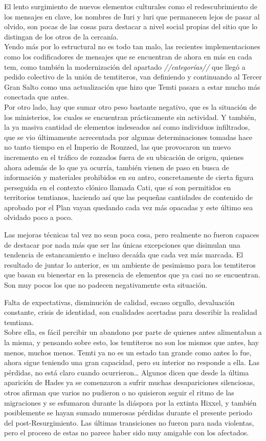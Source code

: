 \documentclass[
  spanish,
]{book}
\begin{document}
El lento surgimiento de nuevos elementos culturales como el redescubrimiento de los mensajes en clave, los nombres de Iuri y luri que permanecen lejos de pasar al olvido, son pocas de las cosas para destacar a nivel social propias del sitio que lo distingan de los otros de la cercanía.\\
Yendo más por lo estructural no es todo tan malo, las recientes implementaciones como los codificadores de mensajes que se encuentran de ahora en más en cada tem, como también la modernización del apartado \emph{//categorías//} que llegó a pedido colectivo de la unión de temtiteros, van definiendo y continuando al Tercer Gran Salto como una actualización que hizo que Temti pasara a estar mucho más conectada que antes.\\
Por otro lado, hay que sumar otro peso bastante negativo, que es la situación de los ministerios, los cuales se encuentran prácticamente sin actividad. Y también, la ya masiva cantidad de elementos indeseados así como individuos infiltrados, que se vio últimamente acrecentada por algunas determinaciones tomadas hace no tanto tiempo en el Imperio de Rouzzed, las que provocaron un nuevo incremento en el tráfico de rozzados fuera de su ubicación de origen, quienes ahora además de lo que ya ocurría, también vienen de paso en busca de información y materiales prohibidos en su antro, concretamente de cierta figura perseguida en el contexto clónico llamada Cati, que sí son permitidos en territorios temtianos, haciendo así que las pequeñas cantidades de contenido de aprobado por el Plan vayan quedando cada vez más opacadas y este último sea olvidado poco a poco.

Las mejoras técnicas tal vez no sean poca cosa, pero realmente no fueron capaces de destacar por nada más que ser las únicas excepciones que disimulan una tendencia de estancamiento e incluso decaída que cada vez más marcada. El resultado de juntar lo anterior, es un ambiente de pesimismo para los temtiteros que basan su bienestar en la presencia de elementos que ya casi no se encuentran. Son muy pocos los que no padecen negativamente esta situación.

Falta de expectativas, disminución de calidad, escaso orgullo, devaluación constante, crisis de identidad, son cualidades acertadas para describir la realidad temtiana.\\
Sobre ella, es fácil percibir un abandono por parte de quienes antes alimentaban a la misma, y pensando sobre esto, los temtiteros no son los mismos que antes, hay menos, muchos menos. Temti ya no es un estado tan grande como antes lo fue, ahora sigue teniendo una gran capacidad, pero su interior no responde a ella. Las pérdidas, no está claro cuando ocurrieron\ldots{} Algunos dicen que desde la última aparición de Hades ya se comenzaron a sufrir muchas desapariciones silenciosas, otros afirman que varios no pudieron o no quisieron seguir el ritmo de las migraciones y se esfumaron durante la diáspora por la extinta Hixxel, y también posiblemente se hayan sumado numerosas pérdidas durante el presente periodo del post-Resurgimiento. Las últimas transiciones no fueron para nada violentas, pero el proceso de estas no parece haber sido muy amigable con los afectados.
\end{document}
